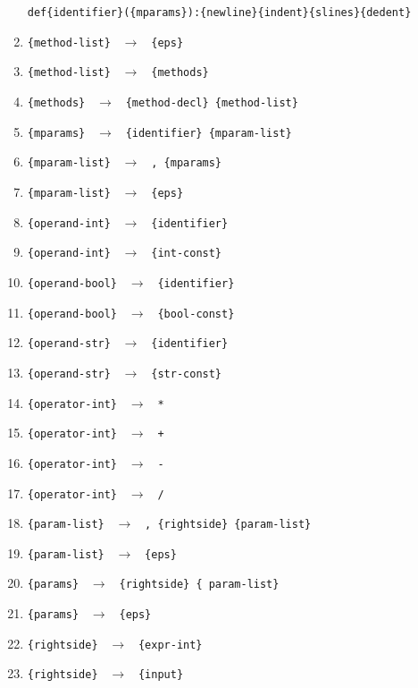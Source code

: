 \documentclass[a4paper,10pt,notitlepage,pdftex]{scrreprt}
\begin{document}
\begin{enumerate}
                    \verb'def{identifier}({mparams}):{newline}{indent}{slines}{dedent}'
                \item \verb'{method-list} ' $\rightarrow$ \verb' {eps}'
                \item \verb'{method-list} ' $\rightarrow$ \verb' {methods}'
                \item \verb'{methods} ' $\rightarrow$ \verb' {method-decl} {method-list}'
                \item \verb'{mparams} ' $\rightarrow$ \verb' {identifier} {mparam-list}'
                \item \verb'{mparam-list} ' $\rightarrow$ \verb' , {mparams}'
                \item \verb'{mparam-list} ' $\rightarrow$ \verb' {eps}'
                \item \verb'{operand-int} ' $\rightarrow$ \verb' {identifier}'
                \item \verb'{operand-int} ' $\rightarrow$ \verb' {int-const}'
                \item \verb'{operand-bool} ' $\rightarrow$ \verb' {identifier}'
                \item \verb'{operand-bool} ' $\rightarrow$ \verb' {bool-const}'
                \item \verb'{operand-str} ' $\rightarrow$ \verb' {identifier}'
                \item \verb'{operand-str} ' $\rightarrow$ \verb' {str-const}'
                \item \verb'{operator-int} ' $\rightarrow$ \verb' *'
                \item \verb'{operator-int} ' $\rightarrow$ \verb' +'
                \item \verb'{operator-int} ' $\rightarrow$ \verb' -'
                \item \verb'{operator-int} ' $\rightarrow$ \verb' /'
                \item \verb'{param-list} ' $\rightarrow$ \verb' , {rightside} {param-list}'
                \item \verb'{param-list} ' $\rightarrow$ \verb' {eps}'
                \item \verb'{params} ' $\rightarrow$ \verb' {rightside} { param-list}'
                \item \verb'{params} ' $\rightarrow$ \verb' {eps}'
                \item \verb'{rightside} ' $\rightarrow$ \verb' {expr-int}'
                \item \verb'{rightside} ' $\rightarrow$ \verb' {input}'

\end{enumerate}
\end{document}
